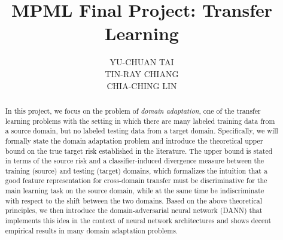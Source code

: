 \documentclass[11pt]{article}
\title{MPML Final Project: Transfer Learning}
\author{
	\parbox{0.25 \textwidth}{\centering YU-CHUAN TAI}
	\quad
	\parbox{0.25 \textwidth}{\centering TIN-RAY CHIANG}
	\quad
	\parbox{0.25 \textwidth}{\centering CHIA-CHING LIN}
}
\date{
	\parbox{0.25 \textwidth}{\centering B03902038}
	\quad
	\parbox{0.25 \textwidth}{\centering B03902072}
	\quad
	\parbox{0.25 \textwidth}{\centering D05921018}
}
\begin{document}
\maketitle

\thispagestyle{plain}

\begin{abstract}
In this project, we focus on the problem of \textit{domain adaptation}, one of the transfer learning problems with the setting in which there are many labeled training data from a source domain, but no labeled testing data from a target domain. Specifically, we will formally state the domain adaptation problem and introduce the theoretical upper bound on the true target risk established in the literature. The upper bound is stated in terms of the source risk and a classifier-induced divergence measure between the training (source) and testing (target) domains, which formalizes the intuition that a good feature representation for cross-domain transfer must be discriminative for the main learning task on the source domain, while at the same time be indiscriminate with respect to the shift between the two domains. Based on the above theoretical principles, we then introduce the domain-adversarial neural network (DANN) that implements this idea in the context of neural network architectures and shows decent empirical results in many domain adaptation problems.
\end{abstract}










\end{document}
